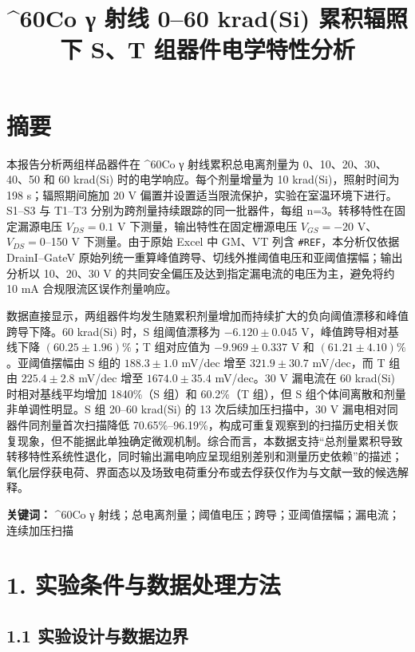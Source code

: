 \documentclass[UTF8,a4paper,12pt]{ctexart}
\title{\^{}60Co γ 射线 0--60 krad(Si) 累积辐照下 S、T
组器件电学特性分析}
\author{}
\date{}
\begin{document}
\maketitle

\section{摘要}\label{ux6458ux8981}

本报告分析两组样品器件在 \^{}60Co γ 射线累积总电离剂量为
0、10、20、30、40、50 和 60 krad(Si) 时的电学响应。每个剂量增量为 10
krad(Si)，照射时间为 198 s；辐照期间施加 20 V
偏置并设置适当限流保护，实验在室温环境下进行。S1--S3 与 T1--T3
分别为跨剂量持续跟踪的同一批器件，每组 n=3。转移特性在固定漏源电压
\(V_{DS}=0.1\) V 下测量，输出特性在固定栅源电压 \(V_{GS}=-20\)
V、\(V_{DS}=0\)--150 V 下测量。由于原始 Excel 中 GM、VT 列含
\texttt{\#REF}，本分析仅依据 DrainI--GateV
原始列统一重算峰值跨导、切线外推阈值电压和亚阈值摆幅；输出分析以
10、20、30 V 的共同安全偏压及达到指定漏电流的电压为主，避免将约 10 mA
合规限流区误作剂量响应。

数据直接显示，两组器件均发生随累积剂量增加而持续扩大的负向阈值漂移和峰值跨导下降。60
krad(Si) 时，S 组阈值漂移为 \(-6.120\pm0.045\) V，峰值跨导相对基线下降
\((60.25\pm1.96)\%\)；T 组对应值为 \(-9.969\pm0.337\) V 和
\((61.21\pm4.10)\%\)。亚阈值摆幅由 S 组的 \(188.3\pm1.0\) mV/dec 增至
\(321.9\pm30.7\) mV/dec，而 T 组由 \(225.4\pm2.8\) mV/dec 增至
\(1674.0\pm35.4\) mV/dec。30 V 漏电流在 60 krad(Si) 时相对基线平均增加
1840\%（S 组）和 60.2\%（T 组），但 S 组个体间离散和剂量非单调性明显。S
组 20--60 krad(Si) 的 13 次后续加压扫描中，30 V
漏电相对同器件同剂量首次扫描降低
70.65\%--96.19\%，构成可重复观察到的扫描历史相关恢复现象，但不能据此单独确定微观机制。综合而言，本数据支持``总剂量累积导致转移特性系统性退化，同时输出漏电响应呈现组别差别和测量历史依赖''的描述；氧化层俘获电荷、界面态以及场致电荷重分布或去俘获仅作为与文献一致的候选解释。

\textbf{关键词：} \^{}60Co γ
射线；总电离剂量；阈值电压；跨导；亚阈值摆幅；漏电流；连续加压扫描

\section{1.
实验条件与数据处理方法}\label{ux5b9eux9a8cux6761ux4ef6ux4e0eux6570ux636eux5904ux7406ux65b9ux6cd5}

\subsection{1.1
实验设计与数据边界}\label{ux5b9eux9a8cux8bbeux8ba1ux4e0eux6570ux636eux8fb9ux754c}
\end{document}
